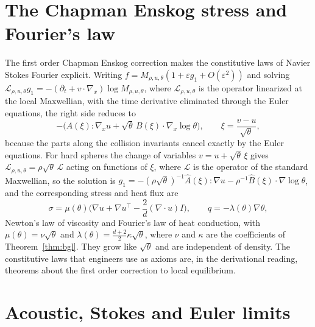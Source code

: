 \section{The Chapman Enskog stress and Fourier's law}

The first order Chapman Enskog correction makes the constitutive laws of Navier Stokes Fourier explicit. Writing $f = M_{\rho,u,\theta}(1+\varepsilon g_1+O(\varepsilon^2))$ and solving $\mathcal{L}_{\rho,u,\theta}g_1 = -(\partial_t+v\cdot\nabla_x)\log M_{\rho,u,\theta}$, where $\mathcal{L}_{\rho,u,\theta}$ is the operator linearized at the local Maxwellian, with the time derivative eliminated through the Euler equations, the right side reduces to
\[
-\Big(A(\xi):\nabla_xu+\sqrt\theta\,B(\xi)\cdot\nabla_x\log\theta\Big),\qquad\xi = \frac{v-u}{\sqrt\theta},
\]
because the parts along the collision invariants cancel exactly by the Euler equations. For hard spheres the change of variables $v = u+\sqrt\theta\,\xi$ gives $\mathcal{L}_{\rho,u,\theta} = \rho\sqrt\theta\,\mathcal{L}$ acting on functions of $\xi$, where $\mathcal{L}$ is the operator of the standard Maxwellian, so the solution is $g_1 = -(\rho\sqrt\theta)^{-1}\hat A(\xi):\nabla u-\rho^{-1}\hat B(\xi)\cdot\nabla\log\theta$, and the corresponding stress and heat flux are
\[
\sigma = \mu(\theta)\Big(\nabla u+\nabla u^\top-\frac2d(\nabla\cdot u)I\Big),\qquad q = -\lambda(\theta)\nabla\theta,
\]
Newton's law of viscosity and Fourier's law of heat conduction, with $\mu(\theta) = \nu\sqrt\theta$ and $\lambda(\theta) = \frac{d+2}{2}\kappa\sqrt\theta$, where $\nu$ and $\kappa$ are the coefficients of Theorem~\ref{thm:bgl}. They grow like $\sqrt\theta$ and are independent of density. The constitutive laws that engineers use as axioms are, in the derivational reading, theorems about the first order correction to local equilibrium.

\section{Acoustic, Stokes and Euler limits}

